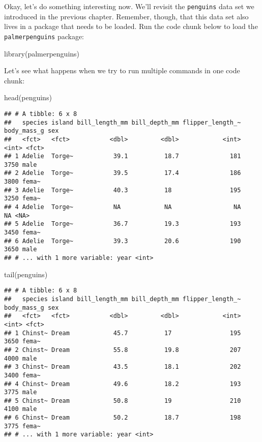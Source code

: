 \documentclass[
]{book}
\newenvironment{Shaded}{\begin{snugshade}}{\end{snugshade}}
\newcommand{\FunctionTok}[1]{\textcolor[rgb]{0.00,0.00,0.00}{#1}}
\newcommand{\NormalTok}[1]{#1}
\begin{document}
Okay, let's do something interesting now. We'll revisit the \texttt{penguins} data set we introduced in the previous chapter. Remember, though, that this data set also lives in a package that needs to be loaded. Run the code chunk below to load the \texttt{palmerpenguins} package:

\begin{Shaded}
\begin{Highlighting}[]
\FunctionTok{library}\NormalTok{(palmerpenguins)}
\end{Highlighting}
\end{Shaded}

Let's see what happens when we try to run multiple commands in one code chunk:

\begin{Shaded}
\begin{Highlighting}[]
\FunctionTok{head}\NormalTok{(penguins)}
\end{Highlighting}
\end{Shaded}

\begin{verbatim}
## # A tibble: 6 x 8
##   species island bill_length_mm bill_depth_mm flipper_length_~ body_mass_g sex  
##   <fct>   <fct>           <dbl>         <dbl>            <int>       <int> <fct>
## 1 Adelie  Torge~           39.1          18.7              181        3750 male 
## 2 Adelie  Torge~           39.5          17.4              186        3800 fema~
## 3 Adelie  Torge~           40.3          18                195        3250 fema~
## 4 Adelie  Torge~           NA            NA                 NA          NA <NA> 
## 5 Adelie  Torge~           36.7          19.3              193        3450 fema~
## 6 Adelie  Torge~           39.3          20.6              190        3650 male 
## # ... with 1 more variable: year <int>
\end{verbatim}

\begin{Shaded}
\begin{Highlighting}[]
\FunctionTok{tail}\NormalTok{(penguins)}
\end{Highlighting}
\end{Shaded}

\begin{verbatim}
## # A tibble: 6 x 8
##   species island bill_length_mm bill_depth_mm flipper_length_~ body_mass_g sex  
##   <fct>   <fct>           <dbl>         <dbl>            <int>       <int> <fct>
## 1 Chinst~ Dream            45.7          17                195        3650 fema~
## 2 Chinst~ Dream            55.8          19.8              207        4000 male 
## 3 Chinst~ Dream            43.5          18.1              202        3400 fema~
## 4 Chinst~ Dream            49.6          18.2              193        3775 male 
## 5 Chinst~ Dream            50.8          19                210        4100 male 
## 6 Chinst~ Dream            50.2          18.7              198        3775 fema~
## # ... with 1 more variable: year <int>
\end{verbatim}
\end{document}
